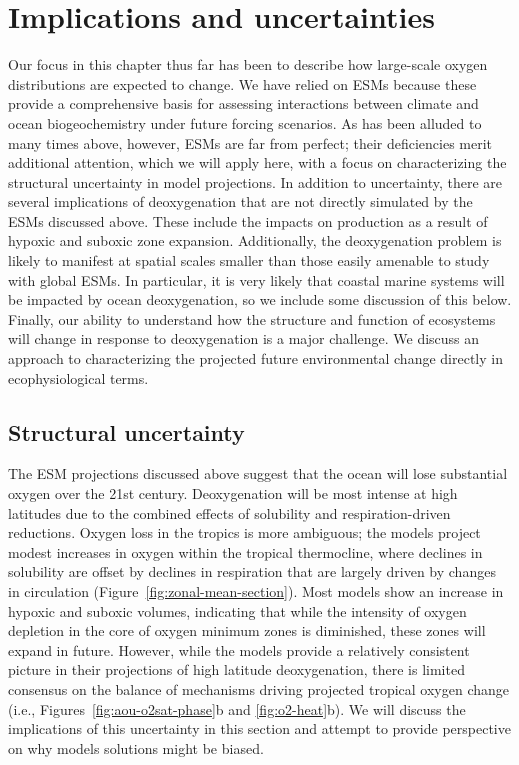 \documentclass{report_chapter}
\begin{document}
\section{Implications and uncertainties}

Our focus in this chapter thus far has been to describe how large-scale oxygen distributions are expected to change.
We have relied on ESMs because these provide a comprehensive basis for assessing interactions between climate and ocean biogeochemistry under future forcing scenarios.
As has been alluded to many times above, however, ESMs are far from perfect; their deficiencies merit additional attention, which we will apply here, with a focus on characterizing the structural uncertainty in model projections.
In addition to uncertainty, there are several implications of deoxygenation that are not directly simulated by the ESMs discussed above.
These include the impacts on \NNO{} production as a result of hypoxic and suboxic zone expansion.
Additionally, the deoxygenation problem is likely to manifest at spatial scales smaller than those easily amenable to study with global ESMs.
In particular, it is very likely that coastal marine systems will be impacted by ocean deoxygenation, so we include some discussion of this below.
Finally, our ability to understand how the structure and function of ecosystems will change in response to deoxygenation is a major challenge.
We discuss an approach to characterizing the projected future environmental change directly in ecophysiological terms.

\subsection{Structural uncertainty} \label{loc:structural-uncertainty}

The ESM projections discussed above suggest that the ocean will lose substantial oxygen over the 21st century.
Deoxygenation will be most intense at high latitudes due to the combined effects of solubility and respiration-driven reductions.
Oxygen loss in the tropics is more ambiguous; the models project modest increases in oxygen within the tropical thermocline, where declines in solubility are offset by declines in respiration that are largely driven by changes in circulation (Figure~\ref{fig:zonal-mean-section}).
Most models show an increase in hypoxic and suboxic volumes, indicating that while the intensity of oxygen depletion in the core of oxygen minimum zones is diminished, these zones will expand in future.
However, while the models provide a relatively consistent picture in their projections of high latitude deoxygenation, there is limited consensus on the balance of mechanisms driving projected tropical oxygen change (i.e., Figures~\ref{fig:aou-o2sat-phase}b and \ref{fig:o2-heat}b).
We will discuss the implications of this uncertainty in this section and attempt to provide perspective on why models solutions might be biased.
\end{document}
